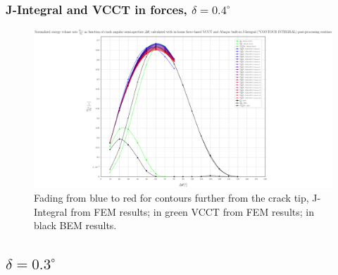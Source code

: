 \documentclass[first,firstsupp,lastsupp,handout,last,hyperref,table]{ETHclass}
\begin{document}
\begin{frame}
\frametitle{\small J-Integral and VCCT in forces, $\delta=0.4^{\circ}$}
\vspace{-0.5cm}
\centering
\captionsetup[figure]{font=scriptsize,labelfont=scriptsize}
\begin{figure}[!h]
\centering
\includegraphics[height=0.7\textheight]{2017-07-10_AbqRunSummary_SmallStrainD04_F-VCCT-JINT_Summary.pdf}
  \caption{\scriptsize Fading from blue to red for contours further from the crack tip, J-Integral from FEM results; in green VCCT from FEM results; in black BEM results.}
  \label{fig:res1}
\end{figure}
\end{frame}



\subsection{$\delta=0.3^{\circ}$}
\end{document}
